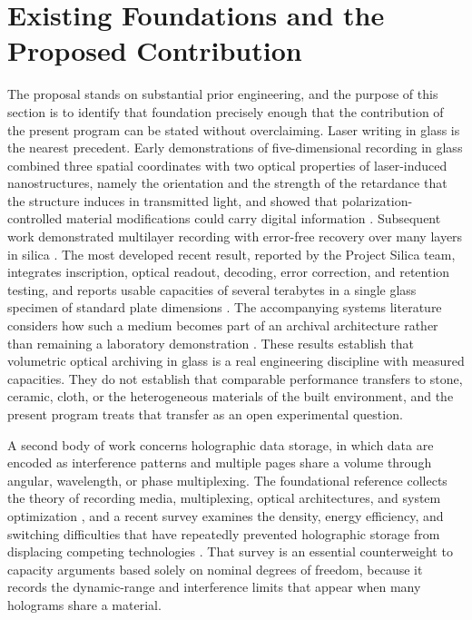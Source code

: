 \section{Existing Foundations and the Proposed Contribution}\label{sec:foundations}

The proposal stands on substantial prior engineering, and the purpose of this section is to identify that foundation precisely enough that the contribution of the present program can be stated without overclaiming. Laser writing in glass is the nearest precedent. Early demonstrations of five-dimensional recording in glass combined three spatial coordinates with two optical properties of laser-induced nanostructures, namely the orientation and the strength of the retardance that the structure induces in transmitted light, and showed that polarization-controlled material modifications could carry digital information \cite{zhang2013}. Subsequent work demonstrated multilayer recording with error-free recovery over many layers in silica \cite{wang2022}. The most developed recent result, reported by the Project Silica team, integrates inscription, optical readout, decoding, error correction, and retention testing, and reports usable capacities of several terabytes in a single glass specimen of standard plate dimensions \cite{silica2026}. The accompanying systems literature considers how such a medium becomes part of an archival architecture rather than remaining a laboratory demonstration \cite{anderson2023}. These results establish that volumetric optical archiving in glass is a real engineering discipline with measured capacities. They do not establish that comparable performance transfers to stone, ceramic, cloth, or the heterogeneous materials of the built environment, and the present program treats that transfer as an open experimental question.

A second body of work concerns holographic data storage, in which data are encoded as interference patterns and multiple pages share a volume through angular, wavelength, or phase multiplexing. The foundational reference collects the theory of recording media, multiplexing, optical architectures, and system optimization \cite{coufal2000}, and a recent survey examines the density, energy efficiency, and switching difficulties that have repeatedly prevented holographic storage from displacing competing technologies \cite{cheriere2025}. That survey is an essential counterweight to capacity arguments based solely on nominal degrees of freedom, because it records the dynamic-range and interference limits that appear when many holograms share a material.

